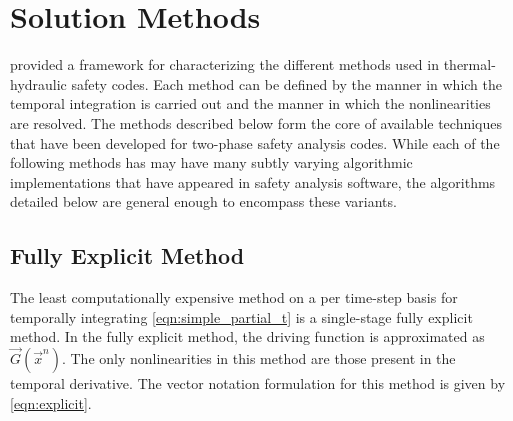 \section{Solution Methods}
\label{sect:solution_techniques}
 provided a framework for characterizing the different methods used in thermal-hydraulic safety codes. 
Each method can be defined by the manner in which the temporal integration is carried out and the manner in which the nonlinearities are resolved.
The methods described below form the core of available techniques that have been developed for two-phase safety analysis codes. 
While each of the following methods has may have many subtly varying algorithmic implementations that have appeared in safety analysis software, the algorithms detailed below are general enough to encompass these variants.

\subsection{Fully Explicit Method}
\label{subsect:numerics_explicit}
The least computationally expensive method on a per time-step basis for temporally integrating \eqref{eqn:simple_partial_t} is a single-stage fully explicit method.
In the fully explicit method, the driving function is approximated as $\vec{G}(\vec{x}^n)$.
The only nonlinearities in this method are those present in the temporal derivative.
The vector notation formulation for this method is given by \eqref{eqn:explicit}. 

